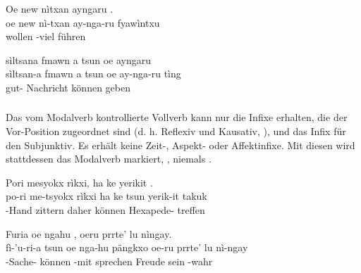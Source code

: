 \begin{interlin}
	\glll \Npawl{}Oe new nìtxan ayngaru . \\
	oe new nì-txan ay-nga-ru fyawìntxu \\
	 wollen -viel  führen \\
\end{interlin}

\begin{interlin}
	\glll \Npawl{}sìltsana fmawn a tsun oe ayngaru  \\
	sìltsan-a fmawn a tsun oe ay-nga-ru tìng \\
	gut- Nachricht  können   geben \\
\end{interlin}

\subsubsection{} \label{syn:modal-syntax} Das vom Modalverb kontrollierte Vollverb kann nur die Infixe erhalten, die der Vor-Position zugeordnet sind (d. h. Reflexiv und Kausativ, ), und das Infix für den Subjunktiv. Es erhält keine Zeit-, Aspekt- oder Affektinfixe. Mit diesen wird stattdessen das Modalverb markiert,  , niemals .

\begin{interlin}
	\glll \Npawl{}Pori mesyokx rìkxi, ha ke  yerikit . \\
	po-ri me-tsyokx rìkxi ha ke tsun yerik-it takuk \\
	 -Hand zittern daher  können Hexapede- treffen \\
\end{interlin}

\begin{interlin}
	\glll \Npawl{}Furia  oe ngahu , oeru prrte' lu nìngay. \\
	fì-'u-ri-a tsun oe nga-hu pängkxo oe-ru prrte' lu nì-ngay \\
	-Sache- können  -mit sprechen  Freude sein -wahr \\
\end{interlin}

